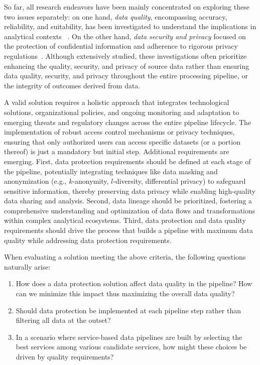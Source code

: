 So far, all research endeavors have been mainly concentrated on exploring these two issues separately: on one hand, \emph{data quality}, encompassing accuracy, reliability, and suitability, has been investigated to understand the implications in analytical contexts~ \cite{Wang2023,surveyquality}.  On the other hand, \emph{data security and privacy} focused on the protection of confidential information and adherence to rigorous privacy regulations~\cite{palanisamy2020survey,thambiraja2012survey,woodruff1997supporting,gdpr}. {\color{OurColor}Although extensively studied, these investigations often prioritize enhancing the quality, security, and privacy of source data rather than ensuring data quality, security, and privacy throughout the entire processing pipeline, or the integrity of outcomes derived from data.}

A valid solution requires a holistic approach that integrates technological solutions, organizational policies, and ongoing monitoring and adaptation to emerging threats and regulatory changes {\color{OurColor}across the entire pipeline lifecycle.} The implementation of robust access control mechanisms or privacy techniques, ensuring that only authorized users can access specific datasets (or a portion thereof) is just a mandatory but initial step.
%
Additional requirements are emerging. First, data protection requirements should be defined at each stage of the {\color{OurColor}pipeline}, potentially integrating techniques like data masking and anonymization (e.g., $k$-anonymity, $l$-diversity, differential privacy) to safeguard sensitive information, thereby preserving data privacy while enabling high-quality data sharing and analysis. Second, data lineage should be prioritized, fostering a comprehensive understanding and optimization of data flows and transformations within complex analytical ecosystems. {\color{OurColor}Third, data protection and data quality requirements should drive the process that builds a pipeline with maximum data quality while addressing data protection requirements.}

When evaluating a solution meeting the above criteria, the following questions naturally arise:
\begin{enumerate}
\item {\color{OurColor}How does a data protection solution affect data quality in the pipeline? How can we minimize this impact thus maximizing the overall data quality?}
\item Should data protection be implemented at each pipeline step rather than filtering all data at the outset?
\item {\color{OurColor}In a scenario where service-based data pipelines are built by selecting the best services among various candidate services, how might these choices be driven by quality requirements?}
\end{enumerate}

